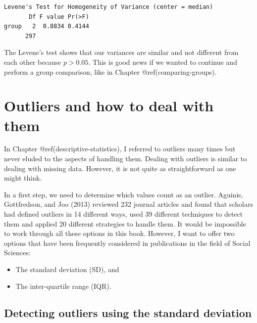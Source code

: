 \documentclass[
  letterpaper,
]{krantz}
\makeatletter
\newenvironment{Shaded}{\begin{snugshade}}{\end{snugshade}}
\newcommand{\FunctionTok}[1]{\textcolor[rgb]{0.28,0.35,0.67}{#1}}
\newcommand{\NormalTok}[1]{\textcolor[rgb]{0.00,0.23,0.31}{#1}}
\newcommand{\SpecialCharTok}[1]{\textcolor[rgb]{0.37,0.37,0.37}{#1}}
\newenvironment{kframe}{%
\medskip{}
\setlength{\fboxsep}{.8em}
 \def\at@end@of@kframe{}%
 \ifinner\ifhmode%
  \def\at@end@of@kframe{\end{minipage}}%
  \begin{minipage}{\columnwidth}%
 \fi\fi%
 \def\FrameCommand##1{\hskip\@totalleftmargin \hskip-\fboxsep
 \colorbox{shadecolor}{##1}\hskip-\fboxsep
     \hskip-\linewidth \hskip-\@totalleftmargin \hskip\columnwidth}%
 \MakeFramed {\advance\hsize-\width
   \@totalleftmargin\z@ \linewidth\hsize
   \@setminipage}}%
 {\par\unskip\endMakeFramed%
 \at@end@of@kframe}
\renewenvironment{Shaded}{\begin{kframe}}{\end{kframe}}
\makeatother
\begin{document}
\begin{Shaded}
\end{Shaded}

\begin{verbatim}
Levene's Test for Homogeneity of Variance (center = median)
       Df F value Pr(>F)
group   2  0.8834 0.4144
      297               
\end{verbatim}

The Levene's test shows that our variances are similar and not different
from each other because \(p > 0.05\). This is good news if we wanted to
continue and perform a group comparison, like in Chapter
@ref(comparing-groups).

\section{Outliers and how to deal with
them}\label{dealing-with-outliers}

In Chapter @ref(descriptive-statistics), I referred to outliers many
times but never eluded to the aspects of handling them. Dealing with
outliers is similar to dealing with missing data. However, it is not
quite as straightforward as one might think.

In a first step, we need to determine which values count as an outlier.
Aguinis, Gottfredson, and Joo (2013) reviewed 232 journal articles and
found that scholars had defined outliers in 14 different ways, used 39
different techniques to detect them and applied 20 different strategies
to handle them. It would be impossible to work through all these options
in this book. However, I want to offer two options that have been
frequently considered in publications in the field of Social Sciences:

\begin{itemize}
\item
  The standard deviation (SD), and
\item
  The inter-quartile range (IQR).
\end{itemize}

\subsection{Detecting outliers using the standard
deviation}\label{ouliers-standard_deviation}
\end{document}
